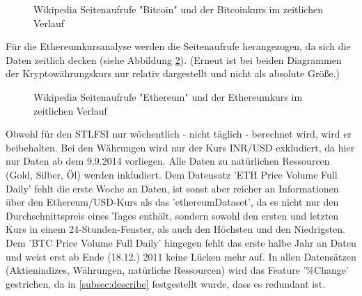 \begin{figure}[H]
\centering
{}
\caption{Wikipedia Seitenaufrufe "Bitcoin" und der Bitcoinkurs im zeitlichen Verlauf}
\label{fig:WikiBTC}
\end{figure}
Für die Ethereumkursanalyse werden die Seitenaufrufe herangezogen, da sich die Daten zeitlich decken (siehe Abbildung \ref{fig:WikiETH}). (Erneut ist bei beiden Diagrammen der Kryptowährungskurs nur relativ dargestellt und nicht als absolute Größe.)
\begin{figure}[H]
\centering
{}
\caption{Wikipedia Seitenaufrufe "Ethereum" und der Ethereumkurs im zeitlichen Verlauf}
\label{fig:WikiETH}
\end{figure}
Obwohl für den STLFSI nur wöchentlich - nicht täglich - berechnet wird, wird er beibehalten. Bei den Währungen wird nur der Kurs INR/USD exkludiert, da hier nur Daten ab dem 9.9.2014 vorliegen. Alle Daten zu natürlichen Ressourcen (Gold, Silber, Öl) werden inkludiert.
Dem Datensatz 'ETH \textunderscore Price \textunderscore Volume \textunderscore Full \textunderscore Daily' fehlt die erste Woche an Daten, ist sonst aber reicher an Informationen über den Ethereum/USD-Kurs als das 'ethereumDataset', da es nicht nur den Durchschnittspreis eines Tages enthält, sondern sowohl den ersten und letzten Kurs in einem 24-Stunden-Fenster, als auch den Höchsten und den Niedrigsten. Dem 'BTC \textunderscore Price \textunderscore Volume \textunderscore Full \textunderscore Daily' hingegen fehlt das erste halbe Jahr an Daten und weist erst ab Ende (18.12.) 2011 keine Lücken mehr auf. In allen Datensätzen (Aktienindizes, Währungen, natürliche Ressourcen) wird das Feature '\%Change' gestrichen, da in \ref{subsec:describe} festgestellt wurde, dass es redundant ist.
